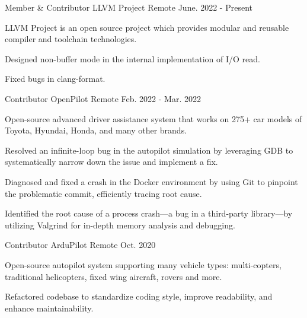 

\begin{cventries}

  \cventry
    {Member \& Contributor} %
    {LLVM Project} %
    {Remote} %
    {June. 2022 - Present} %
    {
      \begin{cvitems} %
        \item {LLVM Project is an open source project which provides modular and reusable compiler and toolchain technologies.}
        \item {Designed non-buffer mode in the internal implementation of I/O read.}
        \item {Fixed bugs in clang-format.}
      \end{cvitems}
    }

  \cventry
    {Contributor} %
    {OpenPilot} %
    {Remote} %
    {Feb. 2022 - Mar. 2022} %
    {
      \begin{cvitems} %
        \item {Open-source advanced driver assistance system that works on 275+ car models of Toyota, Hyundai, Honda, and many other brands.}
        \item {Resolved an infinite-loop bug in the autopilot simulation by leveraging GDB to systematically narrow down the issue and implement a fix.}
        \item {Diagnosed and fixed a crash in the Docker environment by using Git to pinpoint the problematic commit, efficiently tracing root cause.}
        \item {Identified the root cause of a process crash—a bug in a third-party library—by utilizing Valgrind for in-depth memory analysis and debugging.}
      \end{cvitems}
    }

  \cventry
    {Contributor} %
    {ArduPilot} %
    {Remote} %
    {Oct. 2020} %
    {
      \begin{cvitems} %
        \item {Open-source autopilot system supporting many vehicle types: multi-copters, traditional helicopters, fixed wing aircraft, rovers and more.}
        \item {Refactored codebase to standardize coding style, improve readability, and enhance maintainability.}
      \end{cvitems}
    }


\end{cventries}
